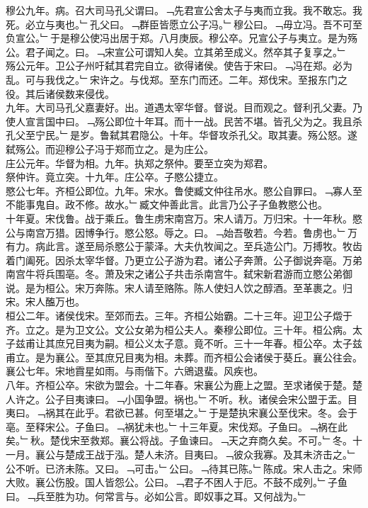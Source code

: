\documentclass{zhvt-classic}
\begin{document}
\hspace*{2em}穆公九年。病。召大司马孔父谓曰。﹁先君宣公舍太子与夷而立我。我不敢忘。我死。必立与夷也。﹂孔父曰。﹁群臣皆愿立公子冯。﹂穆公曰。﹁毋立冯。吾不可至负宣公。﹂于是穆公使冯出居于郑。八月庚辰。穆公卒。兄宣公子与夷立。是为殇公。君子闻之。曰。﹁宋宣公可谓知人矣。立其弟至成义。然卒其子复享之。﹂\\
\hspace*{2em}殇公元年。卫公子州吁弑其君完自立。欲得诸侯。使告于宋曰。﹁冯在郑。必为乱。可与我伐之。﹂宋许之。与伐郑。至东门而还。二年。郑伐宋。至报东门之役。其后诸侯数来侵伐。\\
\hspace*{2em}九年。大司马孔父嘉妻好。出。道遇太宰华督。督说。目而观之。督利孔父妻。乃使人宣言国中曰。﹁殇公即位十年耳。而十一战。民苦不堪。皆孔父为之。我且杀孔父至宁民。﹂是岁。鲁弑其君隐公。十年。华督攻杀孔父。取其妻。殇公怒。遂弑殇公。而迎穆公子冯于郑而立之。是为庄公。\\
\hspace*{2em}庄公元年。华督为相。九年。执郑之祭仲。要至立突为郑君。\\
\hspace*{2em}祭仲许。竟立突。十九年。庄公卒。子愍公捷立。\\
\hspace*{2em}愍公七年。齐桓公即位。九年。宋水。鲁使臧文仲往吊水。愍公自罪曰。﹁寡人至不能事鬼自。政不修。故水。﹂臧文仲善此言。此言乃公子子鱼教愍公也。\\
\hspace*{2em}十年夏。宋伐鲁。战于乘丘。鲁生虏宋南宫万。宋人请万。万归宋。十一年秋。愍公与南宫万猎。因博争行。愍公怒。辱之。曰。﹁始吾敬若。今若。鲁虏也。﹂万有力。病此言。遂至局杀愍公于蒙泽。大夫仇牧闻之。至兵造公门。万搏牧。牧齿着门阖死。因杀太宰华督。乃更立公子游为君。诸公子奔萧。公子御说奔亳。万弟南宫牛将兵围亳。冬。萧及宋之诸公子共击杀南宫牛。弑宋新君游而立愍公弟御说。是为桓公。宋万奔陈。宋人请至赂陈。陈人使妇人饮之醇酒。至革裹之。归宋。宋人醢万也。\\
\hspace*{2em}桓公二年。诸侯伐宋。至郊而去。三年。齐桓公始霸。二十三年。迎卫公子燬于齐。立之。是为卫文公。文公女弟为桓公夫人。秦穆公即位。三十年。桓公病。太子兹甫让其庶兄目夷为嗣。桓公义太子意。竟不听。三十一年春。桓公卒。太子兹甫立。是为襄公。至其庶兄目夷为相。未葬。而齐桓公会诸侯于葵丘。襄公往会。\\
\hspace*{2em}襄公七年。宋地霣星如雨。与雨偕下。六鶂退蜚。风疾也。\\
\hspace*{2em}八年。齐桓公卒。宋欲为盟会。十二年春。宋襄公为鹿上之盟。至求诸侯于楚。楚人许之。公子目夷谏曰。﹁小国争盟。祸也。﹂不听。秋。诸侯会宋公盟于盂。目夷曰。﹁祸其在此乎。君欲已甚。何至堪之。﹂于是楚执宋襄公至伐宋。冬。会于亳。至释宋公。子鱼曰。﹁祸犹未也。﹂十三年夏。宋伐郑。子鱼曰。﹁祸在此矣。﹂秋。楚伐宋至救郑。襄公将战。子鱼谏曰。﹁天之弃商久矣。不可。﹂冬。十一月。襄公与楚成王战于泓。楚人未济。目夷曰。﹁彼众我寡。及其未济击之。﹂公不听。已济未陈。又曰。﹁可击。﹂公曰。﹁待其已陈。﹂陈成。宋人击之。宋师大败。襄公伤股。国人皆怨公。公曰。﹁君子不困人于厄。不鼓不成列。﹂子鱼曰。﹁兵至胜为功。何常言与。必如公言。即奴事之耳。又何战为。﹂\\
\end{document}
